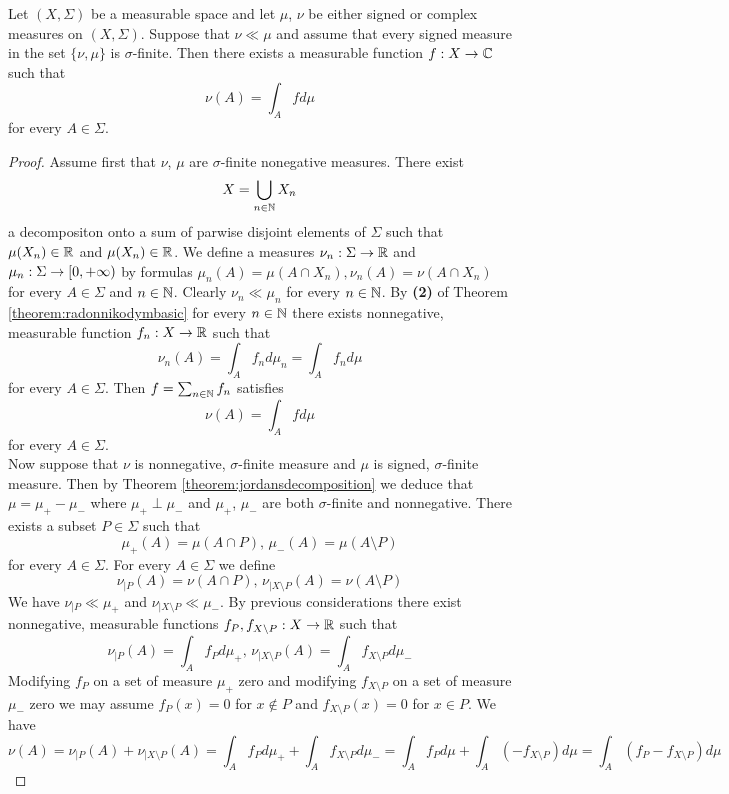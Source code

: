 \begin{theorem}\label{theorem:radonnikodymmain}
Let $(X,\Sigma)$ be a measurable space and let $\mu$, $\nu$ be either signed or complex measures on $(X,\Sigma)$. Suppose that $\nu \ll \mu$ and assume that every signed measure in the set $\{\nu, \mu\}$ is $\sigma$-finite. Then there exists a measurable function $f:X\rightarrow {\mathbb C}$ such that
$$\nu(A) = \int_A f d\mu$$
for every $A\in \Sigma$.
\end{theorem}
\begin{proof}
Assume first that $\nu$, $\mu$ are $\sigma$-finite nonegative measures. There exist
$$X = \bigcup_{n\in {\mathbb N}}X_n$$
a decompositon onto a sum of parwise disjoint elements of $\Sigma$ such that $\mu(X_n)\in {\mathbb R}$ and $\mu(X_n)\in {\mathbb R}$. We define a measures $\nu_n:\Sigma \rightarrow {\mathbb R}$ and $\mu_n:\Sigma \rightarrow [0,+\infty)$ by formulas $\mu_n(A) = \mu(A\cap X_n), \nu_n(A) = \nu(A\cap X_n)$ for every $A\in \Sigma$ and $n\in {\mathbb N}$. Clearly $\nu_n \ll \mu_n$ for every $n\in {\mathbb N}$. By \textbf{(2)} of Theorem \ref{theorem:radonnikodymbasic} for every $n\in {\mathbb N}$ there exists nonnegative, measurable function $f_n:X\rightarrow {\mathbb R}$ such that
$$\nu_n(A) = \int_A f_nd\mu_n = \int_A f_nd\mu$$
for every $A\in \Sigma$. Then $f =\sum_{n\in {\mathbb N}}f_n$ satisfies
$$\nu(A) =\int_A fd\mu$$
for every $A\in \Sigma$.\\
Now suppose that $\nu$ is nonnegative, $\sigma$-finite measure and $\mu$ is signed, $\sigma$-finite measure. Then by Theorem \ref{theorem:jordansdecomposition} we deduce that $\mu = \mu_+-\mu_-$ where $\mu_+\perp \mu_-$ and $\mu_+$, $\mu_-$ are both $\sigma$-finite and nonnegative. There exists a subset $P\in \Sigma$ such that
$$\mu_+(A) = \mu(A\cap P),\,\mu_-(A) = \mu(A\setminus P)$$
for every $A\in \Sigma$. For every $A\in \Sigma$ we define 
$$\nu_{\mid P}(A) = \nu(A\cap P),\,\nu_{\mid X\setminus P}(A) = \nu(A\setminus P)$$
We have $\nu_{\mid P} \ll \mu_+$ and $\nu_{\mid X\setminus P}\ll \mu_-$. By previous considerations there exist nonnegative, measurable functions $f_P, f_{X\setminus P}:X\rightarrow {\mathbb R}$ such that
$$\nu_{\mid P}(A)  = \int_A f_P d\mu_+,\,\nu_{\mid X\setminus P}(A) = \int_A f_{X\setminus P}d\mu_-$$
Modifying $f_P$ on a set of measure $\mu_+$ zero and modifying $f_{X\setminus P}$ on a set of measure $\mu_-$ zero we may assume $f_P(x)=0$ for $x\not \in P$ and $f_{X\setminus P}(x) = 0$ for $x\in P$. We have
$$\nu(A) = \nu_{\mid P}(A)+\nu_{\mid X\setminus P}(A) = \int_Af_{P} d\mu_+ + \int_A f_{X\setminus P}d\mu_- = \int_A f_P d\mu +\int_A(-f_{X\setminus P})d\mu = \int_A(f_{P}-f_{X\setminus P})d\mu$$

\end{proof}

